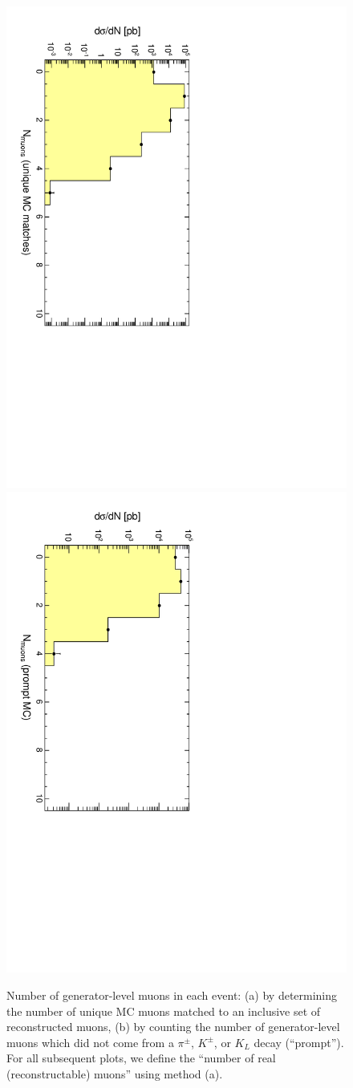 \documentclass[12pt]{article}
\begin{document}
\begin{figure}
\includegraphics[height=0.5\linewidth, angle=90]{fig/backgroundsMatching_plot/nmuons_real.pdf}
\includegraphics[height=0.5\linewidth, angle=90]{fig/backgrounds_plot/nmuons_real.pdf}

\caption{Number of generator-level muons in each event: (a) by determining the number of unique MC muons matched to an inclusive set of reconstructed muons, (b) by counting the number of generator-level muons which did not come from a $\pi^\pm$, $K^\pm$, or $K_L$ decay (``prompt'').  For all subsequent plots, we define the ``number of real (reconstructable) muons'' using method (a). \label{fig:nmuons_real}}
\end{figure}
\end{document}
